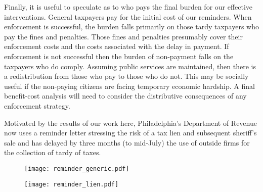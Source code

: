 \documentclass[12pt]{article}
\begin{document}
Finally, it is useful to speculate as to who pays the final burden for
our effective interventions.  General taxpayers pay for the initial
cost of our reminders.  When enforcement is successful, the burden
falls primarily on those tardy taxpayers who pay the fines and
penalties.  Those fines and penalties presumably cover their
enforcement costs and the costs associated with the delay in payment.
If enforcement is not successful then the burden of non-payment falls
on the taxpayers who do comply.  Assuming public services are
maintained, then there is a redistribution from those who pay to those
who do not.  This may be socially useful if the non-paying citizens
are facing temporary economic hardship.  A final benefit-cost analysis
will need to consider the distributive consequences of any enforcement
strategy.

Motivated by the results of our work here, Philadelphia's Department
of Revenue now uses a reminder letter stressing the risk of a tax lien
and subsequent sheriff's sale and has delayed by three months (to
mid-July) the use of outside firms for the collection of tardy of
taxes.

\newpage




\newpage

\begin{appendix}


\begin{figure}[htbp!]
\begin{center}
\texttt{[image: reminder\_generic.pdf]}
\end{center}
\end{figure}

\begin{figure}[htbp!]
\begin{center}
\texttt{[image: reminder\_lien.pdf]}
\end{center}
\end{figure}

\end{appendix}
\end{document}
